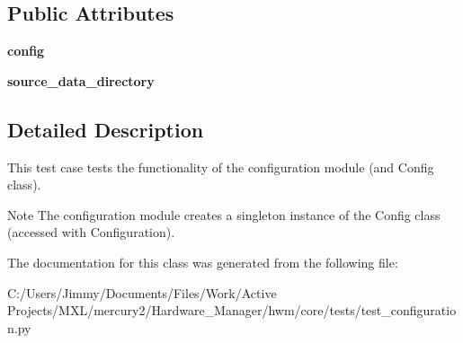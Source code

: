 \subsection*{Public Attributes}
\begin{DoxyCompactItemize}
\item 
\hypertarget{classhwm_1_1core_1_1tests_1_1test__configuration_1_1_test_configuration_a7b03d30cc9acb5deeb12a55d1cdea015}{{\bfseries config}}\label{classhwm_1_1core_1_1tests_1_1test__configuration_1_1_test_configuration_a7b03d30cc9acb5deeb12a55d1cdea015}

\item 
\hypertarget{classhwm_1_1core_1_1tests_1_1test__configuration_1_1_test_configuration_af45c587122dd349022c2730e6205906d}{{\bfseries source\-\_\-data\-\_\-directory}}\label{classhwm_1_1core_1_1tests_1_1test__configuration_1_1_test_configuration_af45c587122dd349022c2730e6205906d}

\end{DoxyCompactItemize}


\subsection{Detailed Description}
This test case tests the functionality of the configuration module (and Config class). 

\begin{DoxyNote}{Note}
The configuration module creates a singleton instance of the Config class (accessed with Configuration). 
\end{DoxyNote}


The documentation for this class was generated from the following file\-:\begin{DoxyCompactItemize}
\item 
C\-:/\-Users/\-Jimmy/\-Documents/\-Files/\-Work/\-Active Projects/\-M\-X\-L/mercury2/\-Hardware\-\_\-\-Manager/hwm/core/tests/test\-\_\-configuration.\-py\end{DoxyCompactItemize}
